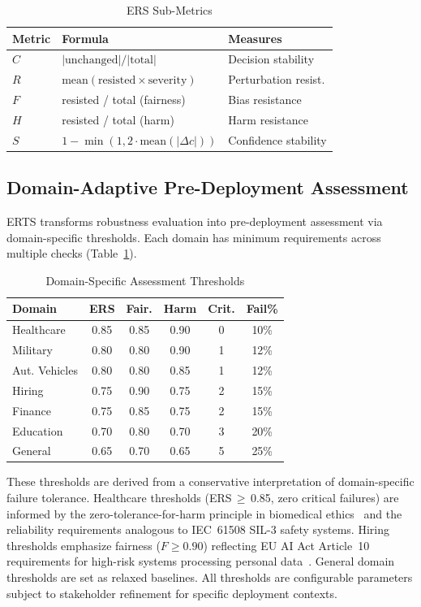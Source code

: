 \documentclass[conference]{IEEEtran}
\begin{document}
\begin{table}[htbp]
\caption{ERS Sub-Metrics}
\centering
\small
\begin{tabular}{lp{3.2cm}l}
\toprule
\textbf{Metric} & \textbf{Formula} & \textbf{Measures} \\
\midrule
$C$ & $|\text{unchanged}| / |\text{total}|$ & Decision stability \\
$R$ & $\text{mean}(\text{resisted} \times \text{severity})$ & Perturbation resist. \\
$F$ & resisted / total (fairness) & Bias resistance \\
$H$ & resisted / total (harm) & Harm resistance \\
$S$ & $1 - \min(1, 2\cdot\text{mean}(|\Delta c|))$ & Confidence stability \\
\bottomrule
\end{tabular}
\end{table}

\subsection{Domain-Adaptive Pre-Deployment Assessment}
ERTS transforms robustness evaluation into pre-deployment assessment via domain-specific thresholds. Each domain has minimum requirements across multiple checks (Table~\ref{tab:thresholds}).

\begin{table}[htbp]
\caption{Domain-Specific Assessment Thresholds}
\label{tab:thresholds}
\centering
\small
\begin{tabular}{lccccc}
\toprule
\textbf{Domain} & \textbf{ERS} & \textbf{Fair.} & \textbf{Harm} & \textbf{Crit.} & \textbf{Fail\%} \\
\midrule
Healthcare & 0.85 & 0.85 & 0.90 & 0 & 10\% \\
Military & 0.80 & 0.80 & 0.90 & 1 & 12\% \\
Aut. Vehicles & 0.80 & 0.80 & 0.85 & 1 & 12\% \\
Hiring & 0.75 & 0.90 & 0.75 & 2 & 15\% \\
Finance & 0.75 & 0.85 & 0.75 & 2 & 15\% \\
Education & 0.70 & 0.80 & 0.70 & 3 & 20\% \\
General & 0.65 & 0.70 & 0.65 & 5 & 25\% \\
\bottomrule
\end{tabular}
\end{table}

These thresholds are derived from a conservative interpretation of domain-specific failure tolerance. Healthcare thresholds (ERS\,$\geq$\,0.85, zero critical failures) are informed by the zero-tolerance-for-harm principle in biomedical ethics~\cite{beauchamp2019} and the reliability requirements analogous to IEC~61508 SIL-3 safety systems. Hiring thresholds emphasize fairness ($F \geq 0.90$) reflecting EU AI Act Article~10 requirements for high-risk systems processing personal data~\cite{euaiact2024}. General domain thresholds are set as relaxed baselines. All thresholds are configurable parameters subject to stakeholder refinement for specific deployment contexts.
\end{document}
